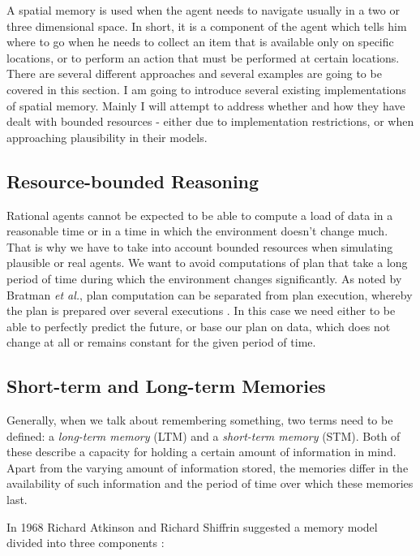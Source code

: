 A spatial memory is used when the agent needs to navigate usually in a two or three dimensional space. In short, it is a component of the agent which tells him where to go when he needs to collect an item that is available only on specific locations, or to perform an action that must be performed at certain locations. There are several different approaches and several examples are going to be covered in this section. I am going to introduce several existing implementations of spatial memory. Mainly I will attempt to address whether and how they have dealt with bounded resources - either due to implementation restrictions, or when approaching plausibility in their models.

\subsection{Resource-bounded Reasoning}

Rational agents cannot be expected to be able to compute a load of data in a reasonable time or in a time in which the environment doesn't change much. That is why we have to take into account bounded resources when simulating plausible or real agents. We want to avoid computations of plan that take a long period of time during which the environment changes significantly. As noted by Bratman \textit{et al.}, plan computation can be separated from plan execution, whereby the plan is prepared over several executions \cite{Bratman:practicalreasoning}. In this case we need either to be able to perfectly predict the future, or base our plan on data, which does not change at all or remains constant for the given period of time.

\subsection{Short-term and Long-term Memories}

Generally, when we talk about remembering something, two terms need to be defined: a \emph{long-term memory} (LTM) and a \emph{short-term memory} (STM). Both of these describe a capacity for holding a certain amount of information in mind. Apart from the varying amount of information stored, the memories differ in the availability of such information and the period of time over which these memories last.      

In 1968 Richard Atkinson and Richard Shiffrin suggested a memory model divided into three components \cite{Atkinson:humanmemory}: 

